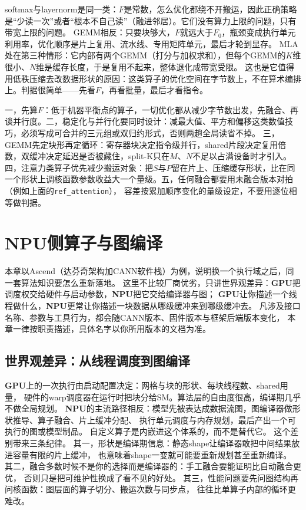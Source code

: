 \documentclass[12pt,a4paper,fontset=fandol]{ctexbook}
\newcommand{\Tp}[1]{\texttt{#1}}
\newcommand{\Dom}[1]{\textsf{\bfseries #1}}
\newcommand{\GPU}{\Dom{GPU}}
\newcommand{\NPU}{\Dom{NPU}}
\begin{document}
\begin{compare}[title={四类算子的瓶颈来源对比}]
softmax与layernorm是同一类：$F$是常数，怎么优化都绕不开搬运，因此正确策略是``少读一次''或者``根本不自己读''（融进邻居）。它们没有算力上限的问题，只有带宽上限的问题。
GEMM相反：只要块够大，$F$就远大于$F_0$，瓶颈变成执行单元利用率，优化顺序是片上复用、流水线、专用矩阵单元，最后才轮到显存。
MLA处在第三种情形：它内部有两个GEMM（打分与加权求和），但每个GEMM的$K$维很小、$N$维是缓存长度，于是复用不起来，整体退化成带宽受限。
这也是它值得用低秩压缩去改数据形状的原因：这类算子的优化空间在字节数上，不在算术编排上。判据很简单——先看$F$，再看批量，最后才看指令。
\end{compare}

\begin{bestpractice}[title={张量算子的落地顺序}]
一，先算$F$：低于机器平衡点的算子，一切优化都从减少字节数出发，先融合、再谈并行度。二，稳定化与并行化要同时设计：减最大值、平方和偏移这类数值技巧，必须写成可合并的三元组或双归约形式，否则两趟全局读省不掉。
三，GEMM先定块形再定循环：寄存器块决定指令级并行，shared片段决定复用倍数，双缓冲决定延迟是否被藏住，split-K只在$M$、$N$不足以占满设备时才引入。
四，注意力类算子优先减少搬运对象：把$S$与$P$留在片上、压缩缓存形状，比在同一个形状上调核函数参数收益大一个量级。五，任何融合都要用未融合版本对拍（例如上面的\Tp{ref\_attention}），
容差按累加顺序变化的量级设定，不要用逐位相等做判据。
\end{bestpractice}
\chapter{NPU侧算子与图编译}

本章以Ascend（达芬奇架构加CANN软件栈）为例，说明换一个执行域之后，同一套算法知识要怎么重新落地。
这里不比较厂商优劣，只讲世界观差异：\GPU{}把调度权交给硬件与启动参数，\NPU{}把它交给编译器与图；
\GPU{}让你描述一个线程做什么，\NPU{}更常让你描述一块数据从哪级缓冲来到哪级缓冲去。
凡涉及接口名称、参数与工具行为，都会随CANN版本、固件版本与框架后端版本变化，
本章一律按职责描述，具体名字以你所用版本的文档为准。

\section{世界观差异：从线程调度到图编译}

\GPU{}上的一次执行由启动配置决定：网格与块的形状、每块线程数、shared用量，
硬件的warp调度器在运行时把块分给SM。算法层的自由度很高，编译期几乎不做全局规划。
\NPU{}的主流路径相反：模型先被表达成数据流图，图编译器做形状推导、算子融合、片上缓冲分配、
执行单元调度与内存规划，最后产出一个可执行的图或模型制品。
自定义算子是内嵌进这个体系的，而不是替代它。
这个差别带来三条纪律。
其一，形状是编译期信息：静态shape让编译器敢把中间结果放进容量有限的片上缓冲，
也意味着shape一变就可能要重新规划甚至重新编译。
其二，融合多数时候不是你的选择而是编译器的：手工融合要能证明比自动融合更优，
否则只是把可维护性换成了看不见的好处。
其三，性能问题要先问图结构再问核函数：图层面的算子切分、搬运次数与同步点，
往往比单算子内部的循环更难改。
\end{document}
